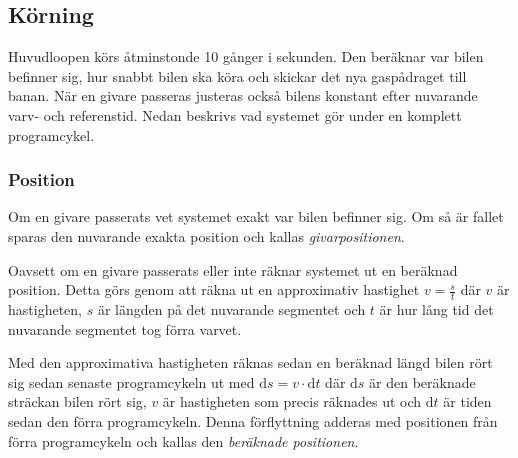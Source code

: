 \subsection{Körning}
\label{sec:systembeskrivning:korning}

Huvudloopen körs åtminstonde 10 gånger i sekunden. Den beräknar var bilen
befinner sig, hur snabbt bilen ska köra och skickar det nya gaspådraget till
banan. När en givare passeras justeras också bilens konstant efter nuvarande
varv- och referenstid. Nedan beskrivs vad systemet gör under en komplett
programcykel.

\subsubsection{Position}
\label{sec:system:korning:position}

Om en givare passerats vet systemet exakt var bilen befinner sig. Om så är
fallet sparas den nuvarande exakta position och kallas \emph{givarpositionen}.


Oavsett om en givare passerats eller inte räknar systemet ut en beräknad
position. Detta görs genom att räkna ut en approximativ hastighet $v =
\frac{s}{t}$ där $v$ är hastigheten, $s$ är längden på det nuvarande segmentet
och $t$ är hur lång tid det nuvarande segmentet tog förra varvet.


Med den approximativa hastigheten räknas sedan en beräknad längd bilen rört sig
sedan senaste programcykeln ut med $\mathrm{d}s = v \cdot \mathrm{d}t$ där
$\mathrm{d}s$ är den beräknade sträckan bilen rört sig, $v$ är hastigheten som
precis räknades ut och $\mathrm{d}t$ är tiden sedan den förra programcykeln.
Denna förflyttning adderas med positionen från förra programcykeln och kallas
den \emph{beräknade positionen}.

